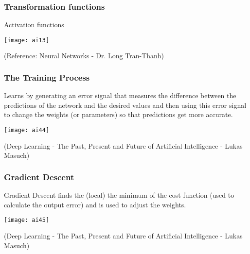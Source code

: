 \begin{frame}[fragile] \frametitle{Transformation functions}
Activation functions
\begin{center}
\texttt{[image: ai13]}
\end{center}
\tiny{(Reference: Neural Networks - Dr. Long Tran-Thanh)}
\end{frame}

\begin{frame}[fragile] \frametitle{The Training Process}
Learns by generating an error signal that measures the difference between the
predictions of the network and the desired values and then using this error signal
to change the weights (or parameters) so that predictions get more accurate.
\begin{center}
\texttt{[image: ai44]}
\end{center}
{\tiny (Deep Learning - The Past, Present and Future of Artificial Intelligence - Lukas Masuch)}
\end{frame}

\begin{frame}[fragile] \frametitle{Gradient Descent}
Gradient Descent finds the (local) the minimum of the cost function (used to
calculate the output error) and is used to adjust the weights.
\begin{center}
\texttt{[image: ai45]}
\end{center}
{\tiny (Deep Learning - The Past, Present and Future of Artificial Intelligence - Lukas Masuch)}
\end{frame}





